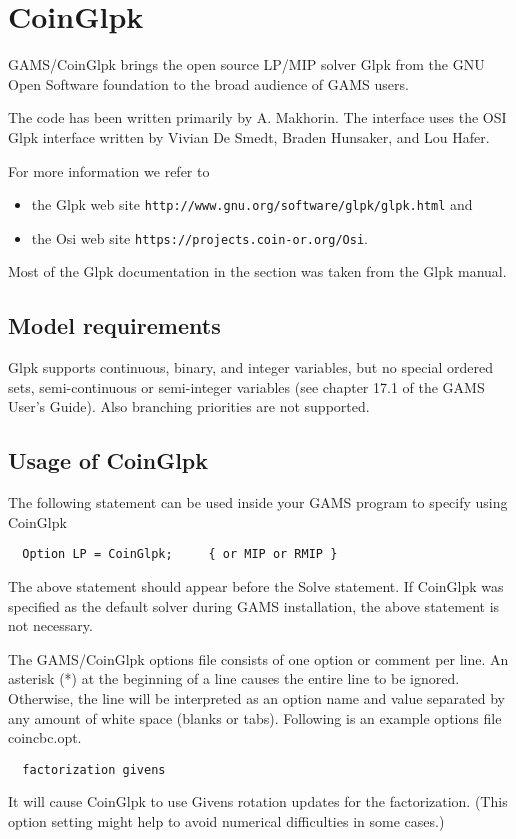 

\section{CoinGlpk}

GAMS/CoinGlpk brings the open source LP/MIP solver Glpk from the GNU Open Software foundation to the broad audience of GAMS users.

The code has been written primarily by A. Makhorin.
The interface uses the OSI Glpk interface written by Vivian De Smedt, Braden Hunsaker, and Lou Hafer.

For more information we refer to
\begin{itemize}
\item the Glpk web site \texttt{http://www.gnu.org/software/glpk/glpk.html} and
\item the Osi web site \texttt{https://projects.coin-or.org/Osi}.
\end{itemize}
Most of the Glpk documentation in the section was taken from the Glpk manual.

\subsection{Model requirements}

Glpk supports continuous, binary, and integer variables, but no special ordered sets, semi-continuous or semi-integer variables (see chapter 17.1 of the GAMS User's Guide).
Also branching priorities are not supported.

\subsection{Usage of CoinGlpk}

The following statement can be used inside your GAMS program to specify using CoinGlpk
\begin{verbatim}
  Option LP = CoinGlpk;     { or MIP or RMIP }
\end{verbatim}

The above statement should appear before the Solve statement.
If CoinGlpk was specified as the default solver during GAMS installation, the above statement is not necessary.

The GAMS/CoinGlpk options file consists of one option or comment per line.
An asterisk (*) at the beginning of a line causes the entire line to be ignored.
Otherwise, the line will be interpreted as an option name and value separated by any amount of white space (blanks or tabs).
Following is an example options file coincbc.opt.
\begin{verbatim}
  factorization givens
\end{verbatim}
It will cause CoinGlpk to use Givens rotation updates for the factorization. (This option setting might help to avoid numerical difficulties in some cases.)

